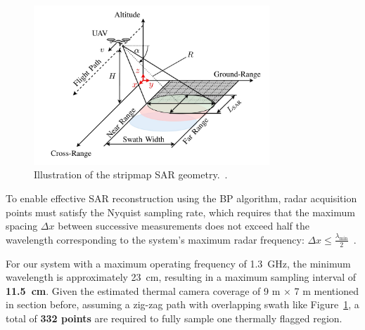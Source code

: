 \begin{figure}[H]
    \centering
    \includegraphics[height=6cm]{figs/Huirui/gpr_swath}
    \caption{Illustration of the stripmap SAR geometry.~\cite{schartel2018uav}.}
    \label{fig:swath_geometry}
\end{figure}

To enable effective \gls{SAR} reconstruction using the \gls{BP} algorithm, radar acquisition points must satisfy the Nyquist sampling rate, which requires that the maximum spacing $\Delta x$ between successive measurements does not exceed half the wavelength corresponding to the system's maximum radar frequency: \(\Delta x \leq \frac{\lambda_{\text{min}}}{2}\)~\cite{9758040}.

For our system with a maximum operating frequency of 1.3~GHz, the minimum wavelength is approximately 23~cm, resulting in a maximum sampling interval of \textbf{11.5~cm}. Given the estimated thermal camera coverage of 9 m × 7 m mentioned in section before, assuming a zig-zag path with overlapping swath like Figure~\ref{fig:swath_geometry}, a total of \textbf{332 points} are required to fully sample one thermally flagged region. 